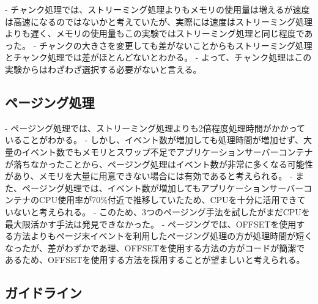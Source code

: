 \documentclass[../../main]{subfiles}
\begin{document}
    - チャンク処理では、ストリーミング処理よりもメモリの使用量は増えるが速度は高速になるのではないかと考えていたが、実際には速度はストリーミング処理よりも遅く、メモリの使用量もこの実験ではストリーミング処理と同じ程度であった。
    - チャンクの大きさを変更しても差がないことからもストリーミング処理とチャンク処理では差がほとんどないとわかる。
    - よって、チャンク処理はこの実験からはわざわざ選択する必要がないと言える。

    \subsection{ページング処理}\label{subsec:consideration-paging}

    - ページング処理では、ストリーミング処理よりも2倍程度処理時間がかかっていることがわかる。
    - しかし、イベント数が増加しても処理時間が増加せず、大量のイベント数でもメモリとスワップ不足でアプリケーションサーバーコンテナが落ちなかったことから、ページング処理はイベント数が非常に多くなる可能性があり、メモリを大量に用意できない場合には有効であると考えられる。
    - また、ページング処理では、イベント数が増加してもアプリケーションサーバーコンテナのCPU使用率が70\%付近で推移していたため、CPUを十分に活用できていないと考えられる。
    - このため、3つのページング手法を試したがまだCPUを最大限活かす手法は発見できなかった。
    - ページングでは、OFFSETを使用する方法よりもページ末イベントを利用したページング処理の方が処理時間が短くなったが、差がわずかであ理、OFFSETを使用する方法の方がコードが簡潔であるため、OFFSETを使用する方法を採用することが望ましいと考えられる。

    \subsection{ガイドライン}\label{subsec:consideration-guideline}

    \clearpage
\end{document}
